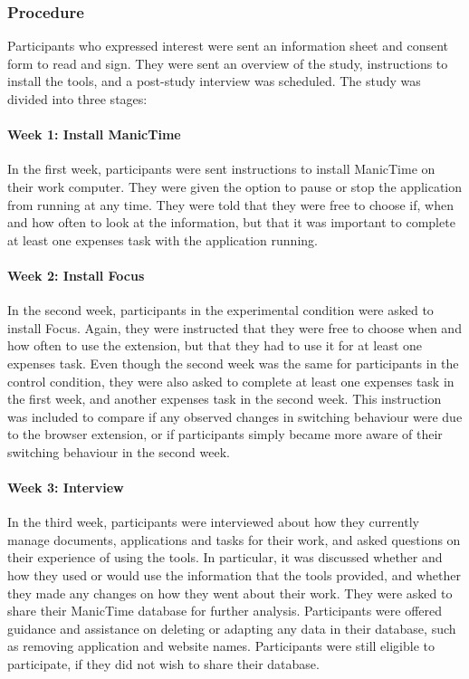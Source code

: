\subsubsection{Procedure}
Participants who expressed interest were sent an information sheet and consent form to read and sign. They were sent an overview of the study, instructions to install the tools, and a post-study interview was scheduled.
The study was divided into three stages:
\paragraph{Week 1: Install ManicTime}
In the first week, participants were sent instructions to install ManicTime on their work computer. They were given the option to pause or stop the application from running at any time. They were told that they were free to choose if, when and how often to look at the information, but that it was important to complete at least one expenses task with the application running. 

\paragraph{Week 2: Install Focus}
In the second week, participants in the experimental condition were asked to install Focus. Again, they were instructed that they were free to choose when and how often to use the extension, but that they had to use it for at least one expenses task. Even though the second week was the same for participants in the control condition, they were also asked to complete at least one expenses task in the first week, and another expenses task in the second week. This instruction was included to compare if any observed changes in switching behaviour were due to the browser extension, or if participants simply became more aware of their switching behaviour in the second week.

\paragraph{Week 3: Interview}
In the third week, participants were interviewed about how they currently manage documents, applications and tasks for their work, and asked questions on their experience of using the tools. In particular, it was discussed whether and how they used or would use the information that the tools provided, and whether they made any changes on how they went about their work. They were asked to share their ManicTime database for further analysis. Participants were offered guidance and assistance on deleting or adapting any data in their database, such as removing application and website names. Participants were still eligible to participate, if they did not wish to share their database.

